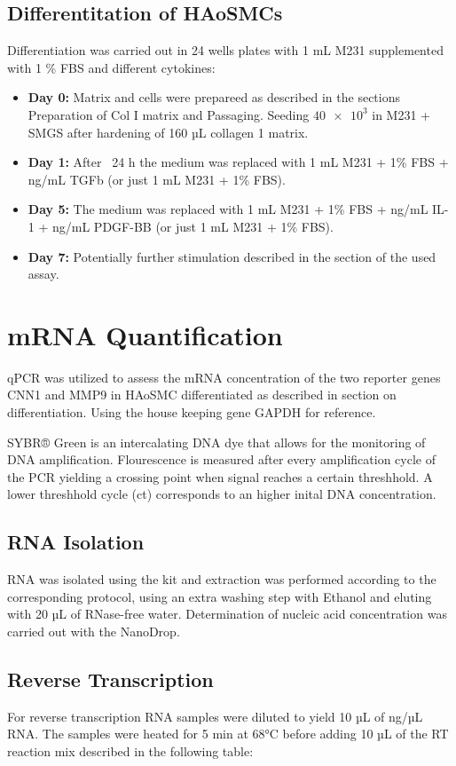     \subsection{Differentitation of HAoSMCs}
    Differentiation was carried out in 24 wells plates with 1 mL M231 supplemented with 1 \% FBS and different cytokines:
    \begin{itemize}
        \item \textbf{Day 0:} Matrix and cells were prepareed as described in the sections Preparation of Col I matrix and Passaging. Seeding $\num{40e3}$ in M231 + SMGS after hardening of 160 µL collagen 1 matrix.
        \item \textbf{Day 1:} After ~24 h the medium was replaced with 1 mL M231 + 1\% FBS + ng/mL TGFb (or just 1 mL M231 + 1\% FBS).
        \item \textbf{Day 5:} The medium was replaced with 1 mL M231 + 1\% FBS + ng/mL IL-1 + ng/mL PDGF-BB (or just 1 mL M231 + 1\% FBS).
        \item \textbf{Day 7:} Potentially further stimulation described in the section of the used assay.
    \end{itemize}

\section{mRNA Quantification}
\label{sec:qpcr}
qPCR was utilized to assess the mRNA concentration of the two reporter genes CNN1 and MMP9 in HAoSMC differentiated as described in section on differentiation. Using the house keeping gene GAPDH for reference.

\noindent SYBR® Green is an intercalating DNA dye that allows for the monitoring of DNA amplification. Flourescence is measured after every amplification cycle of the PCR yielding a crossing point when signal reaches a certain threshhold. A lower threshhold cycle (ct) corresponds to an higher inital DNA concentration.

    \subsection{RNA Isolation}
    RNA was isolated using the kit and extraction was performed according to the corresponding protocol, using an extra washing step with Ethanol and eluting with 20 µL of RNase-free water. Determination of nucleic acid concentration was carried out with the NanoDrop.

    \subsection{Reverse Transcription}
    For reverse transcription RNA samples were diluted to yield 10 µL of ng/µL RNA. The samples were heated for 5 min at 68°C before adding 10 µL of the RT reaction mix described in the following table:

